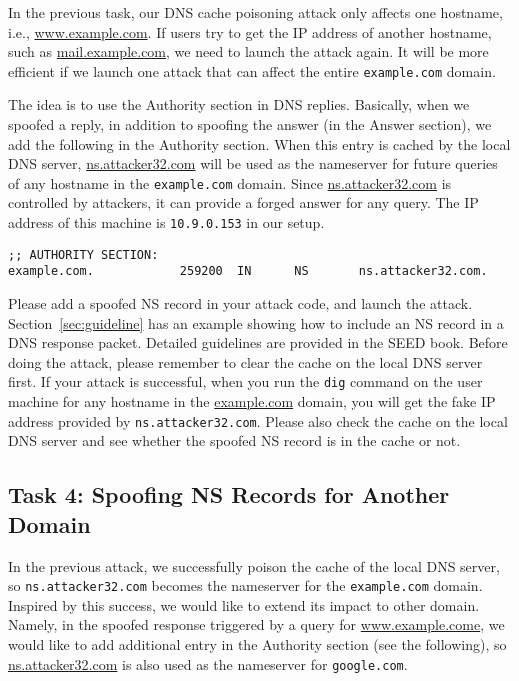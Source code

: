 In the previous task, our DNS cache poisoning attack only affects 
one hostname, i.e., \url{www.example.com}. If users try to get the IP
address of another hostname, such as \url{mail.example.com}, we 
need to launch the attack again. It will be more efficient if we launch one
attack that can affect the entire \texttt{example.com} domain.  

The idea is to use the Authority section in DNS replies. 
Basically, when we spoofed a reply, in addition to spoofing the answer (in
the Answer section), we add the following in the Authority section.
When this entry is cached by the local DNS server, \url{ns.attacker32.com}
will be used as the nameserver for future queries of 
any hostname in the \texttt{example.com} domain.  Since 
\url{ns.attacker32.com} is controlled by attackers, it can
provide a forged answer for any query. The IP address 
of this machine is \texttt{10.9.0.153} in our setup. 

\begin{lstlisting}
;; AUTHORITY SECTION:
example.com.            259200  IN      NS       ns.attacker32.com.
\end{lstlisting}
 

Please add a spoofed NS record in your attack code, and launch the 
attack. Section~\ref{sec:guideline} has an example showing how to
include an NS record in a DNS response packet. 
Detailed guidelines are provided in the SEED book.
Before doing the attack, please remember to clear the cache on 
the local DNS server first.
If your attack is successful, when you run the \texttt{dig} command 
on the user machine for any hostname in the \url{example.com} domain, you will
get the fake IP address provided by \texttt{ns.attacker32.com}. Please also
check the cache on the local DNS server and see whether the spoofed 
NS record is in the cache or not.



\subsection{Task 4: Spoofing NS Records for Another Domain} 

In the previous attack, we successfully poison the cache of the local DNS
server, so \texttt{ns.attacker32.com} becomes the nameserver for the 
\texttt{example.com} domain. Inspired by this success, we would like to 
extend its impact to other domain. Namely, 
in the spoofed response triggered by a query for
\url{www.example.come}, we would like to add additional entry
in the Authority section (see the following), so
\url{ns.attacker32.com} is also used as the nameserver for 
\texttt{google.com}.  


